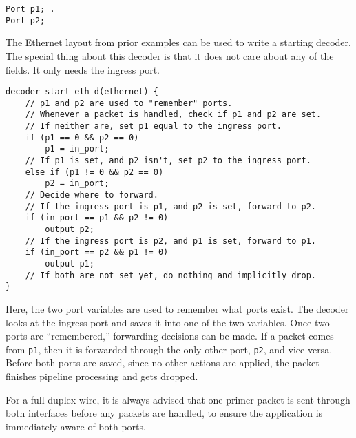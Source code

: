 \begin{codepage}
\begin{lstlisting}
Port p1; .
Port p2;
\end{lstlisting}
\end{codepage}

The Ethernet layout from prior examples can be used to write a starting decoder. The
special thing about this decoder is that it does not care about any of the fields.
It only needs the ingress port.

\begin{codepage}
\begin{lstlisting}
decoder start eth_d(ethernet) {
	// p1 and p2 are used to "remember" ports.
	// Whenever a packet is handled, check if p1 and p2 are set.
	// If neither are, set p1 equal to the ingress port.
	if (p1 == 0 && p2 == 0)
		p1 = in_port;
	// If p1 is set, and p2 isn't, set p2 to the ingress port.
	else if (p1 != 0 && p2 == 0)
		p2 = in_port;
	// Decide where to forward.
	// If the ingress port is p1, and p2 is set, forward to p2.
	if (in_port == p1 && p2 != 0)
		output p2;
	// If the ingress port is p2, and p1 is set, forward to p1.
	if (in_port == p2 && p1 != 0)
		output p1;
	// If both are not set yet, do nothing and implicitly drop.
}
\end{lstlisting}
\end{codepage}

Here, the two port variables are used to remember what ports exist. The decoder
looks at the ingress port and saves it into one of the two variables. Once two
ports are ``remembered,'' forwarding decisions can be made. If a packet comes from
\texttt{p1}, then it is forwarded through the only other port, \texttt{p2}, and
vice-versa. Before both ports are saved, since no other actions are applied, the
packet finishes pipeline processing and gets dropped.

For a full-duplex wire, it is always advised that one primer packet is sent 
through both interfaces before any packets are handled, to ensure the application 
is immediately aware of both ports.
